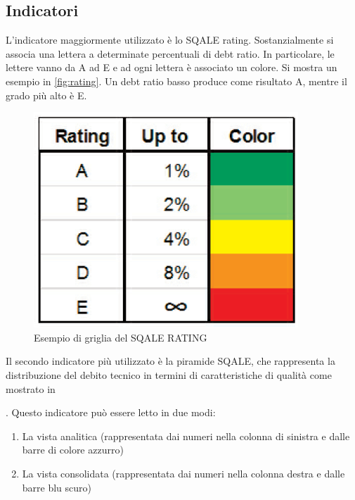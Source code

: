 \subsection{Indicatori}
L'indicatore maggiormente utilizzato è lo SQALE rating. Sostanzialmente si associa una lettera a determinate percentuali di debt ratio. In particolare, le lettere vanno da A ad E e ad ogni lettera è associato un colore. Si mostra un esempio in \autoref{fig:rating}. Un debt ratio basso produce come risultato A, mentre il grado più alto è E.
\begin{figure}[htbp]
	\centering
	\includegraphics[scale=1, trim = 0cm 0cm 0cm 0cm, clip=true]{figSonarCloud/SQUALE1.png}
	\caption{Esempio di griglia del SQALE RATING}
	\label{fig:rating}
\end{figure}
Il secondo indicatore più utilizzato è la piramide SQALE, che rappresenta la distribuzione del debito tecnico in termini di caratteristiche di qualità come mostrato in \author{fig:piramide}. Questo indicatore può essere letto in due modi:
\begin{enumerate}
	\item  La vista analitica (rappresentata dai numeri nella colonna di sinistra e dalle barre di colore azzurro)
	\item La vista consolidata (rappresentata dai numeri nella colonna destra e dalle barre blu scuro)
\end{enumerate}

